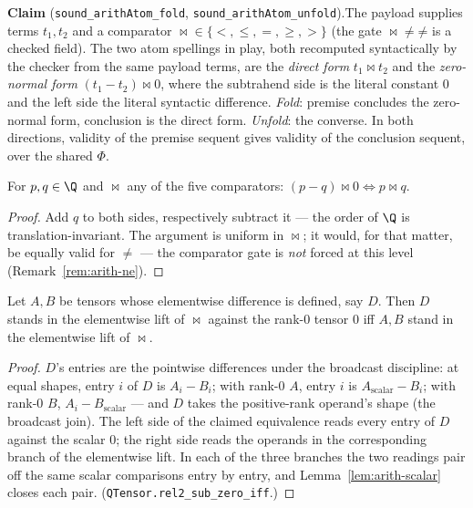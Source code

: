 

\textbf{Claim} (\texttt{sound\_arithAtom\_fold},
\texttt{sound\_arithAtom\_unfold}).\enspace The payload supplies terms
$t_1, t_2$ and a comparator $\bowtie \in \{<, \leq, =, \geq, >\}$ (the
gate $\bowtie \neq \mathord{\neq}$ is a checked field). The two atom
spellings in play, both recomputed syntactically by the checker from the
same payload terms, are the \emph{direct form} $t_1 \bowtie t_2$ and the
\emph{zero-normal form} $(t_1 - t_2) \bowtie 0$, where the subtrahend
side is the literal constant $0$ and the left side the literal syntactic
difference. \emph{Fold}: premise concludes the zero-normal form,
conclusion is the direct form. \emph{Unfold}: the converse. In both
directions, validity of the premise sequent gives validity of the
conclusion sequent, over the shared $\Phi$.

\begin{blemma}\label{lem:arith-scalar}
For $p, q \in \Q$ and $\bowtie$ any of the five comparators:
$(p - q) \bowtie 0 \iff p \bowtie q$.
\end{blemma}
\begin{proof}
Add $q$ to both sides, respectively subtract it --- the order of $\Q$ is
translation-invariant. The argument is uniform in $\bowtie$; it would,
for that matter, be equally valid for $\neq$ --- the comparator gate is
\emph{not} forced at this level (Remark~\ref{rem:arith-ne}).
\end{proof}

\begin{blemma}\label{lem:arith-tensor}
Let $A, B$ be tensors whose elementwise difference is defined, say $D$.
Then $D$ stands in the elementwise lift of $\bowtie$ against the rank-0
tensor $0$ iff $A, B$ stand in the elementwise lift of $\bowtie$.
\end{blemma}
\begin{proof}
$D$'s entries are the pointwise differences under the broadcast
discipline: at equal shapes, entry $i$ of $D$ is $A_i - B_i$; with
rank-0 $A$, entry $i$ is $A_{\mathrm{scalar}} - B_i$; with rank-0 $B$,
$A_i - B_{\mathrm{scalar}}$ --- and $D$ takes the positive-rank
operand's shape (the broadcast join). The left side of the claimed
equivalence reads every entry of $D$ against the scalar $0$; the right
side reads the operands in the corresponding branch of the elementwise
lift. In each of the three branches the two readings pair off the same
scalar comparisons entry by entry, and Lemma~\ref{lem:arith-scalar}
closes each pair. (\texttt{QTensor.rel2\_sub\_zero\_iff}.)
\end{proof}

